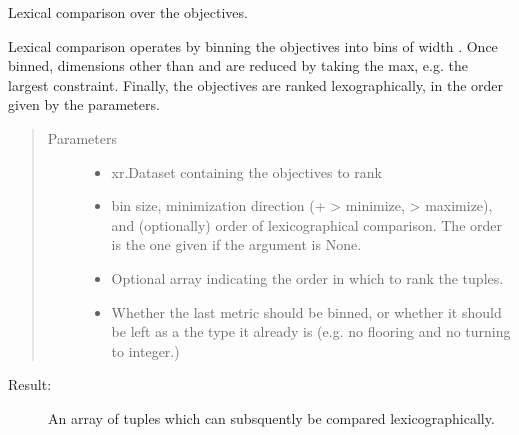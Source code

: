 \documentclass[letterpaper,10pt,english]{sphinxmanual}
\begin{document}
\begin{fulllineitems}
\label{\detokenize{api:muse.utilities.lexical_comparison}}
Lexical comparison over the objectives.

Lexical comparison operates by binning the objectives into bins of width
. Once binned, dimensions other than  and  are
reduced by taking the max, e.g. the largest constraint. Finally, the
objectives are ranked lexographically, in the order given by the parameters.
\begin{quote}\begin{description}
\item[{Parameters}] \leavevmode\begin{itemize}
\item {} 
 \textendash{} xr.Dataset containing the objectives to rank

\item {} 
 \textendash{} bin size, minimization direction
(+ \sphinxhyphen{}\textgreater{} minimize, \sphinxhyphen{} \sphinxhyphen{}\textgreater{} maximize), and (optionally) order of
lexicographical comparison. The order is the one given
 if the argument  is None.

\item {} 
 \textendash{} Optional array indicating the order in which to rank the tuples.

\item {} 
 \textendash{} Whether the last metric should be binned, or whether it
should be left as a the type it already is (e.g. no flooring and
no turning to integer.)

\end{itemize}

\end{description}\end{quote}
\begin{description}
\item[{Result:}] \leavevmode
An array of tuples which can subsquently be compared lexicographically.

\end{description}

\end{fulllineitems}
\end{document}
